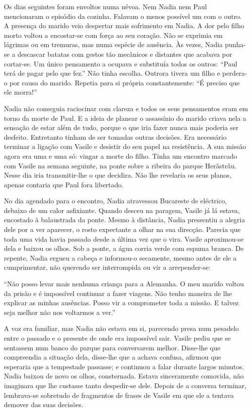 Os dias seguintes foram envoltos numa névoa. Nem Nadia nem Paul
mencionaram o episódio da cozinha. Falavam o menos possível um com o
outro. A presença do marido veio despertar mais sofrimento em Nadia. A
dor pelo filho morto voltou a encostar-se com força ao seu coração. Não
se exprimia em lágrimas ou em tremuras, mas numa espécie de ausência. Às
vezes, Nadia punha-se a descascar batatas com gestos tão mecânicos e
distantes que acabava por cortar-se. Um único pensamento a ocupava e
substituía todos os outros: ``Paul terá de pagar pelo que fez.'' Não tinha
escolha. Outrora tivera um filho e perdera-o por causa do marido.
Repetia para si própria constantemente: ``É preciso que ele morra!''

Nadia não conseguia raciocinar com clareza e todos os seus pensamentos
eram em torno da morte de Paul. E a ideia de planear o assassínio do
marido criava nela a sensação de estar além de tudo, porque o que iria
fazer nunca mais poderia ser desfeito. Entretanto tinham de ser tomadas outras decisões. Era necessário terminar a ligação com Vasile e
desistir do seu papel na resistência. A sua missão agora era uma e uma
só: vingar a morte do filho. Tinha um encontro marcado com Vasile na
semana seguinte, na ponte sobre a ribeira do parque Herǎstrǎu. Nesse
dia iria transmitir-lhe o que decidira. Não lhe revelaria os seus
planos, apenas contaria que Paul fora libertado.

No dia agendado para o encontro, Nadia atravessou Bucareste de
eléctrico, debaixo de um calor asfixiante. Quando desceu na paragem,
Vasile já lá estava, encostado à balaustrada da ponte. Mesmo à
distância, Nadia pressentiu a alegria dele por a ver aparecer, o rosto expectante a olhar na
sua direcção. Parecia que toda uma vida havia passado desde a última vez
que o vira. Vasile aproximou-se dela e baixou os olhos. Sob a ponte, a
água corria verde com espuma branca. De repente, Nadia ergueu a cabeça e
informou-o secamente, mesmo antes de ele a cumprimentar, não querendo
ser interrompida ou vir a arrepender-se:

``Não posso levar mais nenhuma criança para a Alemanha. O meu marido
voltou da prisão e é impossível continuar a fazer viagens. Não tenho
maneira de lhe explicar as minhas ausências. Posso vir a comprometer
toda a missão. E talvez seja melhor não nos voltarmos a ver.''

A voz era familiar, mas Nadia não estava em si, parecendo presa num
pesadelo entre o passado e o presente de onde era impossível sair.
Vasile pediu que se sentassem num banco do parque para conversarem
melhor. Disse-lhe que compreendia a situação dela, disse-lhe que a
achava confusa, afirmou que esperaria que a tempestade passasse; e
continuou a falar durante largos minutos. Nadia baixou de novo os olhos,
consternada. Estava sinceramente comovida, não imaginara que lhe
custasse tanto despedir-se dele. Depois de a conversa terminar,
lembrava-se sobretudo de fragmentos de frases de Vasile em que ele a
tentava demover das suas decisões.

